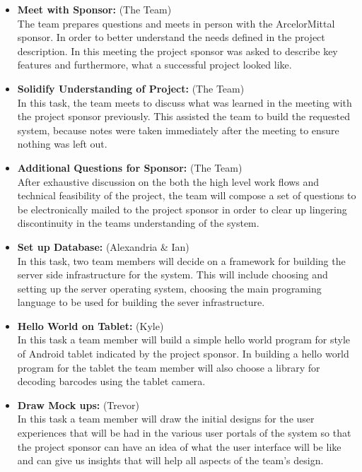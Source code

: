 \documentclass[Letter,11pt]{article}
\begin{document}
		\begin{itemize}
			\item\textbf{Meet with Sponsor:} (The Team)\\
			The team prepares questions and meets in person with the ArcelorMittal sponsor. In order to better understand the needs defined in the project description. In this meeting the project sponsor was asked to describe key features and furthermore, what a successful project looked like.
			
			\item \textbf{Solidify Understanding of Project:} (The Team)\\
			In this task, the team meets to discuss what was learned in the meeting with the project sponsor previously. This assisted the team to build the requested system, because notes were taken immediately after the meeting to ensure nothing was left out. 
			
			\item\textbf{Additional Questions for Sponsor:} (The Team)\\
			After exhaustive discussion on the both the high level work flows and technical feasibility of the project, the team will compose a set of questions to be electronically mailed to the project sponsor in order to clear up lingering discontinuity in the teams understanding of the system.
			
			\item\textbf{Set up Database:} (Alexandria \& Ian)\\
			In this task,  two team members will decide on a framework for building the server side infrastructure for the system. This will include choosing and setting up the server operating system, choosing the main programing language to be used for building the sever infrastructure.
			
			\item\textbf{Hello World on Tablet:} (Kyle)\\
			In this task a team member will build a simple hello world program for style of Android tablet indicated by the project sponsor. In building a hello world program for the tablet the team member will also choose a library for decoding barcodes using the tablet camera. 
			
			\item\textbf{Draw Mock ups:} (Trevor)\\
			In this task a team member will draw the initial designs for the user experiences that will be had in the various user portals of the system so that the project sponsor can have an idea of what the user interface will be like and can give us insights that will help all aspects of the team's design. 
			

\end{itemize}
\end{document}
